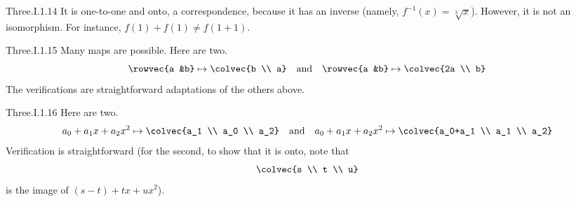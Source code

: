 \begin{ans}{Three.I.1.14}
      It is one-to-one and onto, a correspondence,
      because it has an inverse (namely, \( f^{-1}(x)=\sqrt[3]{x} \)).
      However, it is not an isomorphism.
      For instance, \( f(1)+f(1)\neq f(1+1) \).
    
\end{ans}
\begin{ans}{Three.I.1.15}
     Many maps are possible.
     Here are two.
     \begin{equation*}
       \rowvec{a &b}\mapsto\colvec{b \\ a}
       \quad\text{and}\quad
       \rowvec{a &b}\mapsto\colvec{2a \\ b}
     \end{equation*}
     The verifications are straightforward adaptations of the others above.
    
\end{ans}
\begin{ans}{Three.I.1.16}
      Here are two.
      \begin{equation*}
        a_0+a_1x+a_2x^2 \mapsto \colvec{a_1 \\ a_0 \\ a_2}
        \quad\text{and}\quad
        a_0+a_1x+a_2x^2 \mapsto \colvec{a_0+a_1 \\ a_1 \\ a_2}
      \end{equation*}
      Verification is straightforward (for the second, to show that it is onto,
      note that
      \begin{equation*}
        \colvec{s \\ t \\ u}
      \end{equation*}
      is the image of $(s-t)+tx+ux^2$).
     
\end{ans}
